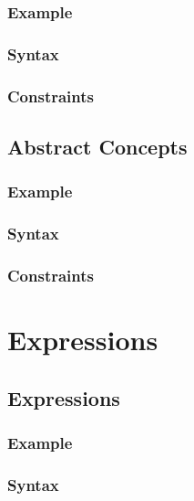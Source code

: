 \documentclass[a4paper,oneside,12pt, extrafontsizes]{memoir}
\begin{document}
\section{Example}


\section{Syntax}


\section{Constraints}


\chapter{Abstract Concepts}
\label{ch:abstract}


\section{Example}


\section{Syntax}


\section{Constraints}


\part{Expressions}

\chapter{Expressions}
\label{ch:expressions}


\section{Example}


\section{Syntax}

\end{document}
